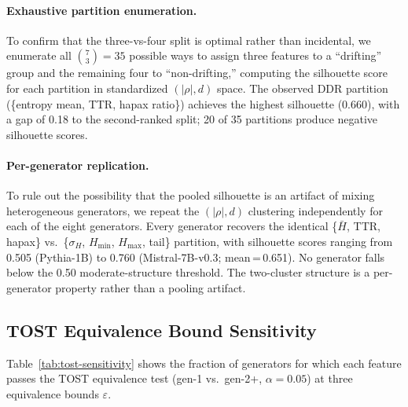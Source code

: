 \paragraph{Exhaustive partition enumeration.}
To confirm that the three-vs-four split is optimal rather than incidental, we enumerate all $\binom{7}{3}{=}35$ possible ways to assign three features to a ``drifting'' group and the remaining four to ``non-drifting,'' computing the silhouette score for each partition in standardized $(|\rho|, d)$ space.
The observed DDR partition (\{entropy mean, TTR, hapax ratio\}) achieves the highest silhouette (0.660), with a gap of 0.18 to the second-ranked split; 20 of 35 partitions produce negative silhouette scores.

\paragraph{Per-generator replication.}
To rule out the possibility that the pooled silhouette is an artifact of mixing heterogeneous generators, we repeat the $(|\rho|, d)$ clustering independently for each of the eight generators.
Every generator recovers the identical \{$\bar{H}$, TTR, hapax\} vs.\ \{$\sigma_H$, $H_{\min}$, $H_{\max}$, tail\} partition, with silhouette scores ranging from 0.505 (Pythia-1B) to 0.760 (Mistral-7B-v0.3; mean\,=\,0.651).
No generator falls below the 0.50 moderate-structure threshold. The two-cluster structure is a per-generator property rather than a pooling artifact.

\subsection*{TOST Equivalence Bound Sensitivity}
\label{app:tost-sensitivity}

Table~\ref{tab:tost-sensitivity} shows the fraction of generators for which each feature passes the TOST equivalence test (gen-1 vs.\ gen-2+, $\alpha{=}0.05$) at three equivalence bounds $\varepsilon$.

\begin{table}[ht]
\centering
\small
\caption{TOST equivalence pass rate across 8 generators at varying $\varepsilon$.}
\label{tab:tost-sensitivity}
\end{table}

